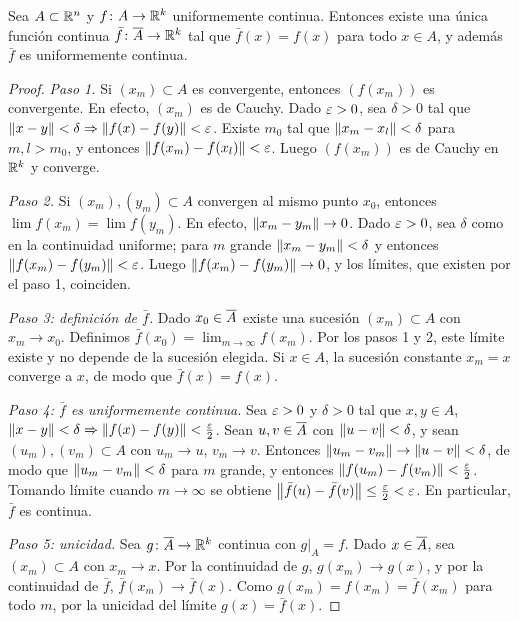 \begin{theorem}
  Sea \(A \subset \mathbb{R}^n\) y \(f\colon A \to \mathbb{R}^k\) uniformemente continua. Entonces existe una única función continua \(\bar{f}\colon \overline{A} \to \mathbb{R}^k\) tal que \(\bar{f}(x) = f(x)\) para todo \(x \in A\), y además \(\bar{f}\) es uniformemente continua.
\end{theorem}

\begin{proof}
  \emph{Paso 1.} Si \({(x_m)} \subset A\) es convergente, entonces \({(f(x_m))}\) es convergente. En efecto, \({(x_m)}\) es de Cauchy. Dado \(\varepsilon > 0\), sea \(\delta > 0\) tal que \(\left\lVert x - y \right\rVert < \delta \Rightarrow \left\lVert f(x) - f(y) \right\rVert < \varepsilon\). Existe \(m_0\) tal que \(\left\lVert x_m - x_l \right\rVert < \delta\) para \(m, l > m_0\), y entonces \(\left\lVert f(x_m) - f(x_l) \right\rVert < \varepsilon\). Luego \({(f(x_m))}\) es de Cauchy en \(\mathbb{R}^k\) y converge.

  \emph{Paso 2.} Si \({(x_m)}, {(y_m)} \subset A\) convergen al mismo punto \(x_0\), entonces \(\lim f(x_m) = \lim f(y_m)\). En efecto, \(\left\lVert x_m - y_m \right\rVert \to 0\). Dado \(\varepsilon > 0\), sea \(\delta\) como en la continuidad uniforme; para \(m\) grande \(\left\lVert x_m - y_m \right\rVert < \delta\) y entonces \(\left\lVert f(x_m) - f(y_m) \right\rVert < \varepsilon\). Luego \(\left\lVert f(x_m) - f(y_m) \right\rVert \to 0\), y los límites, que existen por el paso 1, coinciden.

  \emph{Paso 3: definición de \(\bar{f}\).} Dado \(x_0 \in \overline{A}\) existe una sucesión \({(x_m)} \subset A\) con \(x_m \to x_0\). Definimos \(\bar{f}(x_0) = \lim_{m \to \infty} f(x_m)\). Por los pasos 1 y 2, este límite existe y no depende de la sucesión elegida. Si \(x \in A\), la sucesión constante \(x_m = x\) converge a \(x\), de modo que \(\bar{f}(x) = f(x)\).

  \emph{Paso 4: \(\bar{f}\) es uniformemente continua.} Sea \(\varepsilon > 0\) y \(\delta > 0\) tal que \(x, y \in A\), \(\left\lVert x - y \right\rVert < \delta \Rightarrow \left\lVert f(x) - f(y) \right\rVert < \frac{\varepsilon}{2}\). Sean \(u, v \in \overline{A}\) con \(\left\lVert u - v \right\rVert < \delta\), y sean \({(u_m)}, {(v_m)} \subset A\) con \(u_m \to u\), \(v_m \to v\). Entonces \(\left\lVert u_m - v_m \right\rVert \to \left\lVert u - v \right\rVert < \delta\), de modo que \(\left\lVert u_m - v_m \right\rVert < \delta\) para \(m\) grande, y entonces \(\left\lVert f(u_m) - f(v_m) \right\rVert < \frac{\varepsilon}{2}\). Tomando límite cuando \(m \to \infty\) se obtiene \(\left\lVert \bar{f}(u) - \bar{f}(v) \right\rVert \leq \frac{\varepsilon}{2} < \varepsilon\). En particular, \(\bar{f}\) es continua.

  \emph{Paso 5: unicidad.} Sea \(g\colon \overline{A} \to \mathbb{R}^k\) continua con \(g|_A = f\). Dado \(x \in \overline{A}\), sea \({(x_m)} \subset A\) con \(x_m \to x\). Por la continuidad de \(g\), \(g(x_m) \to g(x)\), y por la continuidad de \(\bar{f}\), \(\bar{f}(x_m) \to \bar{f}(x)\). Como \(g(x_m) = f(x_m) = \bar{f}(x_m)\) para todo \(m\), por la unicidad del límite \(g(x) = \bar{f}(x)\).
\end{proof}

